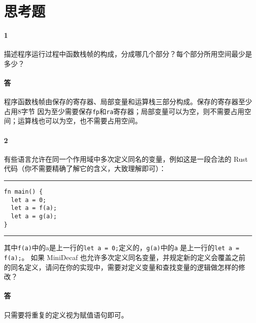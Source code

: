 \documentclass[UTF8]{ctexart}
\newcommand{\T}[1]{\texttt{{#1}}}
\begin{document}
    \section{思考题}
        \paragraph{1} 描述程序运行过程中函数栈帧的构成，分成哪几个部分？每个部分所用空间最少是多少？
        \paragraph{答} 程序函数栈帧由保存的寄存器、局部变量和运算栈三部分构成。保存的寄存器至少占用8字节
        因为至少需要保存\T{fp}和\T{ra}寄存器；局部变量可以为空，则不需要占用空间；运算栈也可以为空，也不需要占用空间。
        \paragraph{2} 有些语言允许在同一个作用域中多次定义同名的变量，例如这是一段合法的 Rust 代码（你不需要精确了解它的含义，大致理解即可）：
        
        \noindent\rule{\textwidth}{1pt}
        \begin{lstlisting}[style=lfonts]
fn main() {
  let a = 0;
  let a = f(a);
  let a = g(a);
}
        \end{lstlisting}
        \noindent\rule{\textwidth}{1pt}
        
        其中\T{f(a)}中的a是上一行的\T{let a = 0;}定义的，\T{g(a)}中的\T{a}
        是上一行的\T{let a = f(a);}。
        如果 MiniDecaf 也允许多次定义同名变量，并规定新的定义会覆盖之前的同名定义，请问在你的实现中，需要对定义变量和查找变量的逻辑做怎样的修改？
        \paragraph{答} 只需要将重复的定义视为赋值语句即可。
\end{document}
